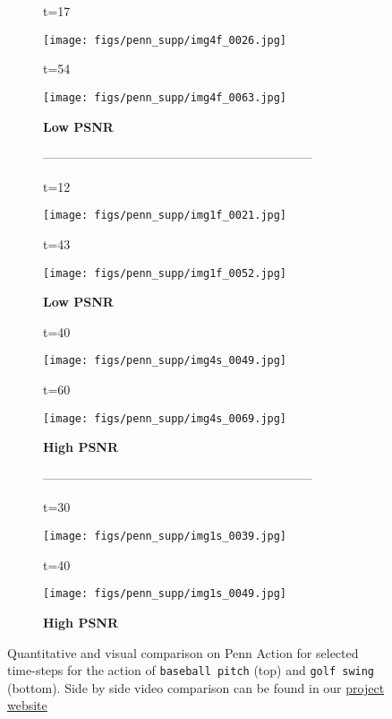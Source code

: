\documentclass{article}
\begin{document}
\begin{appendix}
\begin{figure}[htb!]
    \centering
    \vspace{-10pt}
    \begin{subfigure}{0.40\linewidth}
        \caption*{t=17}
        \vspace{-9pt}
	    \texttt{[image: figs/penn\_supp/img4f\_0026.jpg]}
  		\caption*{t=54}
        \vspace{-9pt}
  		\texttt{[image: figs/penn\_supp/img4f\_0063.jpg]}
  		\caption*{\textbf{Low PSNR}}
  		\caption*{-----------------------------------------------------------------}
        \caption*{t=12}
        \vspace{-9pt}
	    \texttt{[image: figs/penn\_supp/img1f\_0021.jpg]}
  		\caption*{t=43}
        \vspace{-9pt}
  		\texttt{[image: figs/penn\_supp/img1f\_0052.jpg]}
  		\caption*{\textbf{Low PSNR}}
	\end{subfigure}
	\hspace{10pt}
    \begin{subfigure}{0.40\linewidth}
        \caption*{t=40}
        \vspace{-9pt}
	    \texttt{[image: figs/penn\_supp/img4s\_0049.jpg]}
  		\caption*{t=60}
        \vspace{-9pt}
  		\texttt{[image: figs/penn\_supp/img4s\_0069.jpg]}
  		\caption*{\textbf{High PSNR}}
  		\caption*{-----------------------------------------------------------------}
        \caption*{t=30}
        \vspace{-9pt}
	    \texttt{[image: figs/penn\_supp/img1s\_0039.jpg]}
  		\caption*{t=40}
        \vspace{-9pt}
  		\texttt{[image: figs/penn\_supp/img1s\_0049.jpg]}
  		\caption*{\textbf{High PSNR}}
	\end{subfigure}
	\vspace{-.3cm}
    \caption{Quantitative and visual comparison on Penn Action for selected time-steps for the action of \texttt{baseball pitch} (top) and \texttt{golf swing} (bottom). Side by side video comparison can be found in our \href{https://goo.gl/U7UOfy}{project website}}
\label{fig:pennbad1}
\vspace{-40pt}
\end{figure}


\end{appendix}
\end{document}
